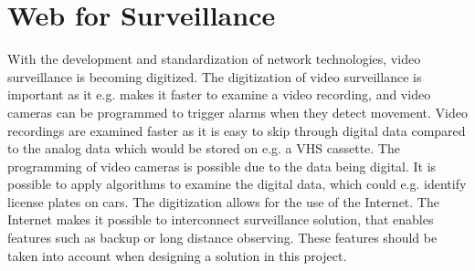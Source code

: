 \section{Web for Surveillance}
With the development and standardization of network technologies, video surveillance is becoming digitized.
The digitization of video surveillance is important as it e.g. makes it faster to examine a video recording, and video cameras can be programmed to trigger alarms when they detect movement.
Video recordings are examined faster as it is easy to skip through digital data compared to the analog data which would be stored on e.g. a VHS cassette.
The programming of video cameras is possible due to the data being digital. 
It is possible to apply algorithms to examine the digital data, which could e.g. identify license plates on cars.
The digitization allows for the use of the Internet.
The Internet makes it possible to interconnect surveillance solution, that enables features such as backup or long distance observing.
These features should be taken into account when designing a solution in this project.